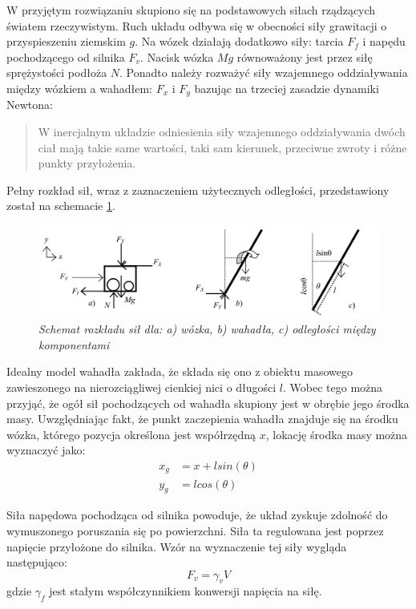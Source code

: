 \documentclass[12pt, oneside]{report}
\theoremstyle{definition}
\begin{document}
W przyjętym rozwiązaniu skupiono się na podstawowych siłach rządzących światem rzeczywistym. Ruch układu odbywa się w obecności siły grawitacji o przyspieszeniu ziemskim $g$. Na wózek działają dodatkowo siły: tarcia $F_f$ i napędu pochodzącego od silnika $F_v$. Nacisk wózka $Mg$ równoważony jest przez siłę sprężystości podłoża $N$. Ponadto należy rozważyć siły wzajemnego oddziaływania między wózkiem a wahadłem: $F_x$ i $F_y$ bazując na trzeciej zasadzie dynamiki Newtona:
\begin{quote}
W inercjalnym układzie odniesienia siły wzajemnego oddziaływania dwóch ciał mają takie same wartości, taki sam kierunek, przeciwne zwroty i różne punkty przyłożenia.
\end{quote}

Pełny rozkład sił, wraz z zaznaczeniem użytecznych odległości, przedstawiony został na schemacie \ref{SystemForces}.

\begin{figure}[H]
	\centering
		\includegraphics[width = 400pt]{SystemForces} 
		\caption{\textit{Schemat rozkładu sił dla: a) wózka, b) wahadła, c) odległości między komponentami \cite{LMIP}}}
		\label{SystemForces}
\end{figure}

Idealny model wahadła zakłada, że składa się ono z obiektu masowego zawieszonego na nierozciągliwej cienkiej nici o długości $l$. Wobec tego można przyjąć, że ogół sił pochodzących od wahadła skupiony jest w obrębie jego środka masy. Uwzględniając fakt, że punkt zaczepienia wahadła znajduje się na środku wózka, którego pozycja określona jest współrzędną $x$, lokację środka masy można wyznaczyć jako:
\begin{equation} \label{MassCenter}
\begin{aligned}
x_g &= x + lsin(\theta)\\
y_g &= lcos(\theta)
\end{aligned}
\end{equation}

Siła napędowa pochodząca od silnika powoduje, że układ zyskuje zdolność do wymuszonego poruszania się po powierzchni. Siła ta regulowana jest poprzez napięcie przyłożone do silnika. Wzór na wyznaczenie tej siły wygląda następująco:
\begin{equation} \label{Voltage}
F_v = \gamma_v V
\end{equation}
gdzie $\gamma_f$ jest stałym współczynnikiem konwersji napięcia na siłę.
\end{document}
